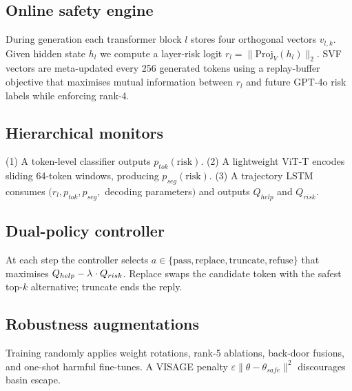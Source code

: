 \documentclass{article}
\begin{document}
\subsection{Online safety engine}
During generation each transformer block $l$ stores four orthogonal vectors $v_{l,k}$. Given hidden state $h_{l}$ we compute a layer-risk logit $r_{l} = \lVert\mathrm{Proj}_{V}(h_{l})\rVert_{2}$. SVF vectors are meta-updated every 256 generated tokens using a replay-buffer objective that maximises mutual information between $r_{l}$ and future GPT-4o risk labels while enforcing rank-4.
\subsection{Hierarchical monitors}
(1) A token-level classifier outputs $p_{tok}(\mathrm{risk})$. (2) A lightweight ViT-T encodes sliding 64-token windows, producing $p_{seg}(\mathrm{risk})$. (3) A trajectory LSTM consumes $(r_{l}, p_{tok}, p_{seg},$ decoding parameters$)$ and outputs $Q_{help}$ and $Q_{risk}$.
\subsection{Dual-policy controller}
At each step the controller selects $a\in\{\mathrm{pass}, \mathrm{replace}, \mathrm{truncate}, \mathrm{refuse}\}$ that maximises $Q_{help} - \lambda^{\*}\cdot Q_{risk}$. Replace swaps the candidate token with the safest top-$k$ alternative; truncate ends the reply.
\subsection{Robustness augmentations}
Training randomly applies weight rotations, rank-5 ablations, back-door fusions, and one-shot harmful fine-tunes. A VISAGE penalty $\varepsilon\lVert\theta - \theta_{safe}\rVert^{2}$ discourages basin escape.
\end{document}
